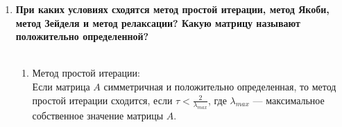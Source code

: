 \documentclass[12pt,a4paper]{article}
\begin{document}
\begin{enumerate}
\\
[Метод Зейделя.]\\
\\
[Метод релаксации.]\\
\\
\item \textbf{При каких условиях сходятся метод простой итерации, метод Якоби, метод Зейделя и метод релаксации? Какую матрицу называют положительно определенной?}\\
\\
\begin{enumerate}
\item Метод простой итерации:\\
Если матрица $A$ симметричная и положительно определенная, то метод простой итерации сходится, если $\tau<\frac{2}{\lambda_{max}}$, где $\lambda_{max}$ --- максимальное собственное значение матрицы $A$.\\


\end{enumerate}
\end{enumerate}
\end{document}
